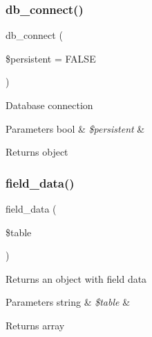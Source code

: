 \subsubsection{\texorpdfstring{db\+\_\+connect()}{db\_connect()}}
{\footnotesize\ttfamily db\+\_\+connect (\begin{DoxyParamCaption}\item[{}]{\$persistent = {\ttfamily FALSE} }\end{DoxyParamCaption})}

Database connection


\begin{DoxyParams}[1]{Parameters}
bool & {\em \$persistent} & \\
\hline
\end{DoxyParams}
\begin{DoxyReturn}{Returns}
object 
\end{DoxyReturn}
\mbox{\label{class_c_i___d_b__pdo__dblib__driver_a90355121e1ed009e0efdbd544ab56efa}} 
\subsubsection{\texorpdfstring{field\+\_\+data()}{field\_data()}}
{\footnotesize\ttfamily field\+\_\+data (\begin{DoxyParamCaption}\item[{}]{\$table }\end{DoxyParamCaption})}

Returns an object with field data


\begin{DoxyParams}[1]{Parameters}
string & {\em \$table} & \\
\hline
\end{DoxyParams}
\begin{DoxyReturn}{Returns}
array 
\end{DoxyReturn}
\mbox{\label{class_c_i___d_b__pdo__dblib__driver_a6080dae0886626b9a4cedb29240708b1}} 
